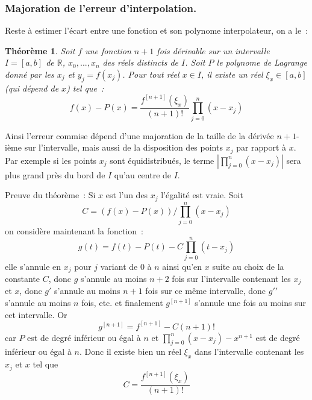 \documentclass[a4paper,11pt]{article}
\newtheorem{thm}{Théorème}
\newcommand{\R}{{\mathbb{R}}}
\begin{document}
\subsubsection{Majoration de l'erreur d'interpolation.}
Reste \`a estimer l'\'ecart entre une fonction et son polynome
interpolateur, on a le~:
\begin{thm} 
Soit $f$ une fonction $n+1$ fois d\'erivable sur un intervalle $I=[a,b]$
de $\R$, $x_0,...,x_n$ des r\'eels distincts de $I$. 
Soit $P$ le polynome de Lagrange donn\'e par les $x_j$ et $y_j=f(x_j)$.
Pour tout r\'eel $x \in I$,
il existe un r\'eel $\xi_x \in [a,b]$ (qui d\'epend de $x$) tel
que~:
\begin{equation} \label{eq:lagrange}
 f(x)-P(x) = \frac{f^{[n+1]}(\xi_x)}{(n+1)!} \prod_{j=0}^n(x-x_j) 
\end{equation}
\end{thm}
Ainsi l'erreur commise d\'epend d'une majoration de la taille
de la d\'eriv\'ee $n+1$-i\`eme sur l'intervalle, mais aussi
de la disposition des points $x_j$ par rapport \`a $x$. Par exemple
si les points $x_j$ sont \'equidistribu\'es, le terme
$|\prod_{j=0}^n(x-x_j)|$ sera plus grand pr\`es du bord de $I$ qu'au
centre de $I$.

Preuve du th\'eor\`eme~: Si $x$ est l'un des $x_j$ l'égalité est vraie. Soit 
\[ C=(f(x)-P(x))/\prod_{j=0}^n(x-x_j) \]
on considère maintenant la fonction~:
\[ g(t)=f(t)-P(t) - C \prod_{j=0}^n(t-x_j) \]
elle s'annule en $x_j$ pour $j$ variant de 0 à $n$ ainsi qu'en $x$
suite au choix de la constante $C$, donc $g$ s'annule au moins $n+2$ fois
sur l'intervalle contenant les $x_j$ et $x$, donc $g'$ s'annule au moins
$n+1$ fois sur ce même intervalle, donc $g'{'}$ s'annule au moins
$n$ fois, etc. et finalement $g^{[n+1]}$ s'annule une fois
au moins sur cet intervalle. Or 
\[ g^{[n+1]} = f^{[n+1]} - C (n+1)!\]
car $P$ est de degré inférieur ou égal à $n$ 
et $ \prod_{j=0}^n(x-x_j) - x^{n+1}$ est de degré
inférieur ou égal à $n$. Donc il existe bien un réel $\xi_x$ dans
l'intervalle contenant les $x_j$ et $x$ tel que
\[ C=\frac{f^{[n+1]}(\xi_x)}{(n+1)!} \]
\end{document}
